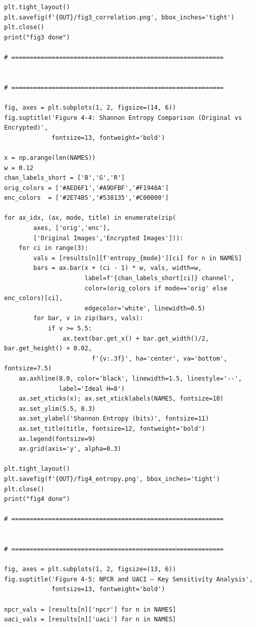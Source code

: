 \begin{verbatim}
plt.tight_layout()
plt.savefig(f'{OUT}/fig3_correlation.png', bbox_inches='tight')
plt.close()
print("fig3 done")

# ==========================================================


# ==========================================================

fig, axes = plt.subplots(1, 2, figsize=(14, 6))
fig.suptitle('Figure 4-4: Shannon Entropy Comparison (Original vs Encrypted)',
             fontsize=13, fontweight='bold')

x = np.arange(len(NAMES))
w = 0.12
chan_labels_short = ['B','G','R']
orig_colors = ['#AED6F1','#A9DFBF','#F1948A']
enc_colors  = ['#2E74B5','#538135','#C00000']

for ax_idx, (ax, mode, title) in enumerate(zip(
        axes, ['orig','enc'],
        ['Original Images','Encrypted Images'])):
    for ci in range(3):
        vals = [results[n][f'entropy_{mode}'][ci] for n in NAMES]
        bars = ax.bar(x + (ci - 1) * w, vals, width=w,
                      label=f'{chan_labels_short[ci]} channel',
                      color=(orig_colors if mode=='orig' else enc_colors)[ci],
                      edgecolor='white', linewidth=0.5)
        for bar, v in zip(bars, vals):
            if v >= 5.5:
                ax.text(bar.get_x() + bar.get_width()/2, bar.get_height() + 0.02,
                        f'{v:.3f}', ha='center', va='bottom', fontsize=7.5)
    ax.axhline(8.0, color='black', linewidth=1.5, linestyle='--',
               label='Ideal H=8')
    ax.set_xticks(x); ax.set_xticklabels(NAMES, fontsize=10)
    ax.set_ylim(5.5, 8.3)
    ax.set_ylabel('Shannon Entropy (bits)', fontsize=11)
    ax.set_title(title, fontsize=12, fontweight='bold')
    ax.legend(fontsize=9)
    ax.grid(axis='y', alpha=0.3)

plt.tight_layout()
plt.savefig(f'{OUT}/fig4_entropy.png', bbox_inches='tight')
plt.close()
print("fig4 done")

# ==========================================================


# ==========================================================

fig, axes = plt.subplots(1, 2, figsize=(13, 6))
fig.suptitle('Figure 4-5: NPCR and UACI — Key Sensitivity Analysis',
             fontsize=13, fontweight='bold')

npcr_vals = [results[n]['npcr'] for n in NAMES]
uaci_vals = [results[n]['uaci'] for n in NAMES]


\end{verbatim}
